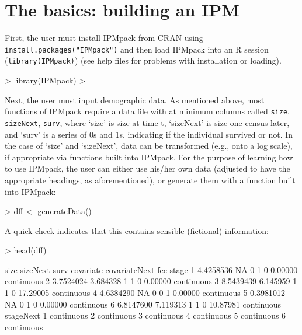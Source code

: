 \documentclass{article}
\begin{document}
\section{The basics: building an IPM}

First, the user must install IPMpack from CRAN using
{\tt install.packages("IPMpack")} and then load IPMpack into an R session
({\tt library(IPMpack)}) (see help files for problems with installation or loading). 

\begin{Schunk}
\begin{Sinput}
> library(IPMpack)
> 
\end{Sinput}
\end{Schunk}
Next, the user must input demographic data. As mentioned above, most functions of IPMpack require a data file with at minimum columns called {\tt size}, {\tt sizeNext}, {\tt surv}, where `size' is size at time t, `sizeNext' is size one census later, and `surv' is a series of 0s and 1s, indicating if the individual survived or not. In the case of `size' and `sizeNext', data can be transformed (e.g., onto a log scale), if appropriate via functions built into IPMpack. For the purpose of learning how to use IPMpack, the user can either use his/her own data (adjusted to have the appropriate headings, as aforementioned), or generate them with a function built into IPMpack:

\begin{Schunk}
\begin{Sinput}
> dff <- generateData()
\end{Sinput}
\end{Schunk}
A quick check indicates that this contains sensible (fictional) information: 
\begin{Schunk}
\begin{Sinput}
> head(dff)
\end{Sinput}
\begin{Soutput}
       size sizeNext surv covariate covariateNext      fec      stage
1 4.4258536       NA    0         1             0  0.00000 continuous
2 3.7524024 3.684328    1         1             0  0.00000 continuous
3 8.5439439 6.145959    1         1             0 17.29005 continuous
4 4.6384290       NA    0         0             1  0.00000 continuous
5 0.3981012       NA    0         1             0  0.00000 continuous
6 6.8147600 7.119313    1         1             0 10.87981 continuous
   stageNext
1 continuous
2 continuous
3 continuous
4 continuous
5 continuous
6 continuous
\end{Soutput}
\end{Schunk}
\end{document}
